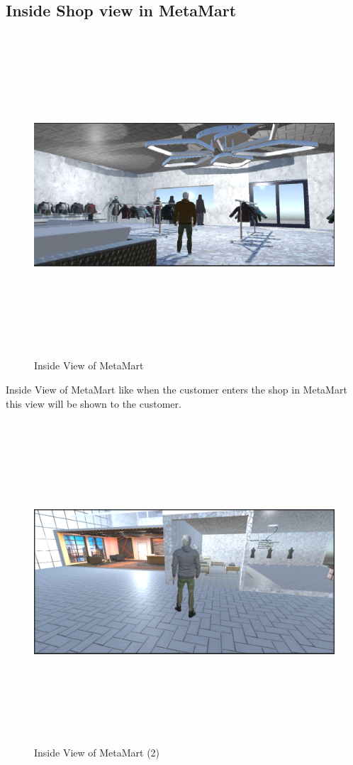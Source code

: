 \subsection{Inside Shop view in MetaMart}
\begin{figure}[H]
    \centering
    \includegraphics[width=13cm,height=12cm]{Figures/Environment/insideshop.png}
    \caption{Inside View of MetaMart}
    \label{fig:Inside View of MetaMart}
\end{figure}
  Inside View of MetaMart like when the customer enters the shop in MetaMart this view will be shown to the customer.
  \begin{figure}[H]
    \centering
    \includegraphics[width=13cm,height=12cm]{Figures/Environment/insideview22.png}
    \caption{Inside View of MetaMart (2)}
    \label{fig:Inside View of MetaMart(2)}
\end{figure}
